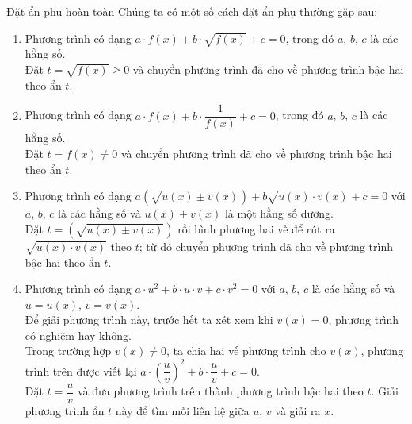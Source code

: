 \begin{dang}{Đặt ẩn phụ hoàn toàn}
	Chúng ta có một số cách đặt ẩn phụ thường gặp sau:
	\begin{enumerate}
		\item Phương trình có dạng $a\cdot f(x)+b\cdot\sqrt{f(x)}+c=0$, trong đó $a$, $b$, $c$ là các hằng số.\\
		Đặt $t=\sqrt{f(x)}\geq 0$ và chuyển phương trình đã cho về phương trình bậc hai theo ẩn $t$.
		\item Phương trình có dạng $a\cdot f(x) + b\cdot \dfrac{1}{f(x)}+c=0$, trong đó $a$, $b$, $c$ là các hằng số.\\
		Đặt $t=f(x)\neq 0$ và chuyển phương trình đã cho về phương trình bậc hai theo ẩn $t$.
		\item Phương trình có dạng $a\left(\sqrt{u(x)\pm v(x)}\right) + b\sqrt{u(x)\cdot v(x)}+c=0$ với $a$, $b$, $c$ là các hằng số và $u(x)+v(x)$ là một hằng số dương.\\
		Đặt $t=\left(\sqrt{u(x)\pm v(x)}\right)$ rồi bình phương hai vế để rút ra $\sqrt{u(x)\cdot v(x)}$ theo $t$; từ đó chuyển phương trình đã cho về phương trình bậc hai theo ẩn $t$.
		\item Phương trình có dạng $a\cdot u^2+b\cdot u\cdot v + c\cdot v^2=0$ với $a$, $b$, $c$ là các hằng số và $u=u(x)$, $v=v(x)$.\\
		Để giải phương trình này, trước hết ta xét xem khi $v(x)=0$, phương trình có nghiệm hay không.\\
		Trong trường hợp $v(x)\neq 0$, ta chia hai vế phương trình cho $v(x)$, phương trình trên được viết lại $a\cdot \left(\dfrac{u}{v}\right)^2+b\cdot \dfrac{u}{v}+c=0$.\\
		Đặt $t=\dfrac{u}{v}$ và đưa phương trình trên thành phương trình bậc hai theo $t$. Giải phương trình ẩn $t$ này để tìm mối liên hệ giữa $u$, $v$ và giải ra $x$.
	\end{enumerate}
\end{dang}

